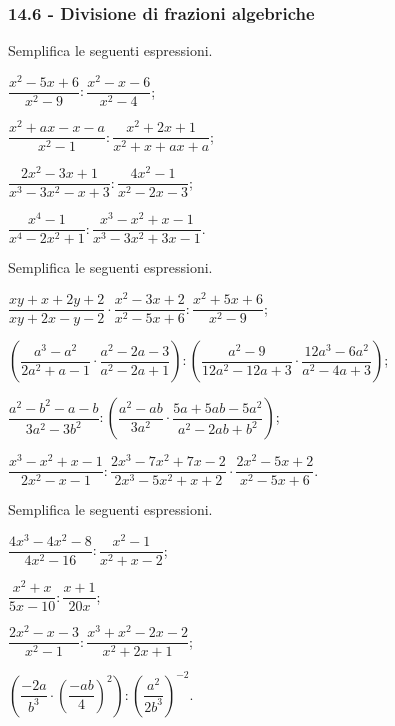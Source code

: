\subsubsection*{14.6 - Divisione di frazioni algebriche}

\begin{esercizio}[\Ast]
\label{ese:14.19}
Semplifica le seguenti espressioni.
\begin{multicols}{2}
\begin{enumeratea}
 \item $\dfrac{x^{2}-5x+6}{x^{2}-9}:\dfrac{x^{2}-x-6}{x^{2}-4}$;
 \item $\dfrac{x^{2}+ax-x-a}{x^{2}-1}:\dfrac{x^{2}+2x+1}{x^{2}+x+ax+a}$;
 \item $\dfrac{2x^{2}-3x+1}{x^{3}-3x^{2}-x+3}:\dfrac{4x^{2}-1}{x^{2}-2x-3}$;
 \item $\dfrac{x^{4}-1}{x^{4}-2x^{2}+1}:\dfrac{x^{3}-x^{2}+x-1}{x^{3}-3x^{2}+3x-1}$.
\end{enumeratea}
\end{multicols}
\end{esercizio}

\begin{esercizio}[\Ast]
\label{ese:14.20}
Semplifica le seguenti espressioni.
\begin{enumeratea}
 \item $\dfrac{xy+x+2y+2}{xy+2x-y-2}\cdot\dfrac{x^{2}-3x+2}{x^{2}-5x+6}:\dfrac{x^{2}+5x+6}{x^{2}-9}$;
 \item $\left(\dfrac{a^{3}-a^{2}}{2a^{2}+a-1}\cdot\dfrac{a^{2}-2a-3}{a^{2}-2a+1}\right):\left(\dfrac{a^{2}-9}{12a^{2}-12a+3}\cdot\dfrac{12a^{3}-6a^{2}}{a^{2}-4a+3}\right)$;
 \item $\dfrac{a^{2}-b^{2}-a-b}{3a^{2}-3b^{2}}:\left(\dfrac{a^{2}-ab}{3a^{2}}\cdot\dfrac{5a+5ab-5a^{2}}{a^{2}-2ab+b^{2}}\right)$;
 \item $\dfrac{x^{3}-x^{2}+x-1}{2x^{2}-x-1}:\dfrac{2x^{3}-7x^{2}+7x-2}{2x^{3}-5x^{2}+x+2}\cdot\dfrac{2x^{2}-5x+2}{x^{2}-5x+6}$.%
\end{enumeratea}
\end{esercizio}

\begin{esercizio}
\label{ese:14.21}
Semplifica le seguenti espressioni.
\begin{multicols}{2}
\begin{enumeratea}
 \item $\dfrac{4x^{3}-4x^{2}-8}{4x^{2}-16}:\dfrac{x^{2}-1}{x^{2}+x-2}$;
 \item $\dfrac{x^{2}+x}{5x-10}:\dfrac{x+1}{20x}$;
 \item $\dfrac{2x^{2}-x-3}{x^{2}-1}:\dfrac{x^{3}+x^{2}-2x-2}{x^{2}+2x+1}$;
 \item $\left(\dfrac{-{2a}}{b^{3}}\cdot\left(\dfrac{-{ab}}{4}\right)^{2}\right):\left(\dfrac{a^{2}}{2b^{3}}\right)^{-2}$.%
\end{enumeratea}
\end{multicols}
\end{esercizio}

